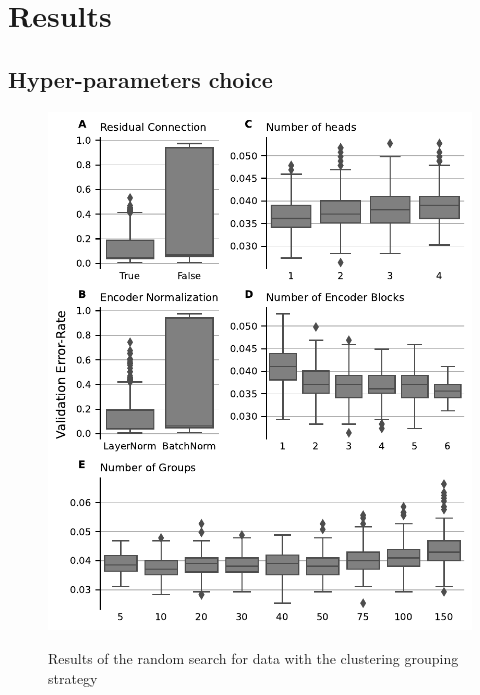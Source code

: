 \documentclass[../main.tex]{subfiles}
\begin{document}
\section{Results}

	\subsection{Hyper-parameters choice}

		\begin{figure}[htbp]
			\centering
			\begin{subcaptiongroup}
				\includegraphics[width=0.9\linewidth]{Beaude.168.fig.2.pdf}
				\label{fig:attomics_hparams_search_A}
				\label{fig:attomics_hparams_search_B}
				\label{fig:attomics_hparams_search_C}
				\label{fig:attomics_hparams_search_D}
				\label{fig:attomics_hparams_search_E}
			\end{subcaptiongroup}
			\caption[Attomics hyperparameters search results]{Results of the random search for  data with the clustering grouping strategy}\label{fig:hparams_search}
		\end{figure}
\end{document}
